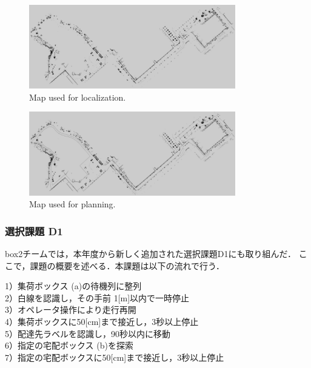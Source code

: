\documentclass[twocolumn, 9pt]{jsproceedings}
\begin{document}
\begin{figure}[h!]
  \centering
  \includegraphics[width=90mm]{fig/map.pdf}
  \caption{Map used for localization.}
  \label{fig:map}
\end{figure}
\vspace*{-1mm}
\begin{figure}[h!]
  \centering
  \includegraphics[width=90mm]{fig/costmap.pdf}
  \caption{Map used for planning.}
  \label{fig:costmap}
\end{figure}





\subsubsection{選択課題 D1}
box2チームでは，本年度から新しく追加された選択課題D1にも取り組んだ．
ここで，課題の概要を述べる．本課題は以下の流れで行う．

\vspace*{1mm}

1）集荷ボックス (a)の待機列に整列\\
\hspace*{1zw}2）白線を認識し，その手前 1[m]以内で一時停止\\
\hspace*{1zw}3）オペレータ操作により走行再開\\
\hspace*{1zw}4）集荷ボックスに50[cm]まで接近し，3秒以上停止\\
\hspace*{1zw}5）配達先ラベルを認識し，90秒以内に移動\\
\hspace*{1zw}6）指定の宅配ボックス (b)を探索\\
\hspace*{1zw}7）指定の宅配ボックスに50[cm]まで接近し，3秒以上停止
\end{document}
